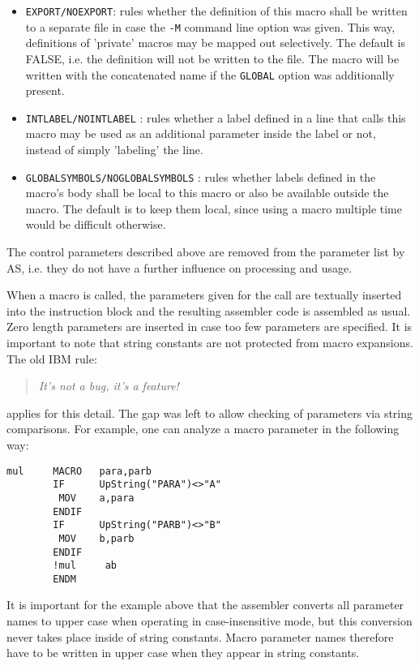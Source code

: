 \documentclass[12pt,twoside]{report}
\newcommand{\tty}[1]{{\tt #1}}
\begin{document}
\begin{itemize}
{      and be assigned to section \tty{C}.  This option is turned off by default
      and it only has an effect when it is used from within a section.
      The macro defined locally is not influenced by this option.}
\item{\tty{EXPORT/NOEXPORT}: rules whether the definition of this macro
      shall be written to a separate file in case the \tty{-M} command line
      option was given.  This way, definitions of 'private' macros may
      be mapped out selectively.  The default is FALSE, i.e. the
      definition will not be written to the file.  The macro will be
      written with the concatenated name if the \tty{GLOBAL} option was
      additionally present.}
\item{\tty{INTLABEL/NOINTLABEL} : rules whether a label defined in a line
      that calls this macro may be used as an additional parameter inside
      the label or not, instead of simply 'labeling' the line.}
\item{\tty{GLOBALSYMBOLS/NOGLOBALSYMBOLS} : rules whether labels
      defined in the macro's body shall be local to this macro or
      also be available outside the macro.  The default is to
      keep them local, since using a macro multiple time would be
      difficult otherwise.}
\end{itemize}
The control parameters described above are removed from the parameter
list by AS, i.e. they do not have a further influence on processing
and usage.

When a macro is called, the parameters given for the call are
textually inserted into the instruction block and the resulting
assembler code is assembled as usual.  Zero length parameters are
inserted in case too few parameters are specified.  It is important
to note that string constants are not protected from macro
expansions.  The old IBM rule:
\begin{quote}{\it
 It's not a bug, it's a feature!
}\end{quote}
applies for this detail.  The gap was left to allow checking of
parameters via string comparisons.  For example, one can analyze a
macro parameter in the following way:
\begin{verbatim}
mul     MACRO   para,parb
        IF      UpString("PARA")<>"A"
         MOV    a,para
        ENDIF
        IF      UpString("PARB")<>"B"
         MOV    b,parb
        ENDIF
        !mul     ab
        ENDM
\end{verbatim}
It is important for the example above that the assembler converts all
parameter names to upper case when operating in case-insensitive
mode, but this conversion never takes place inside of string constants.
Macro parameter names therefore have to be written in upper case when
they appear in string constants.
\end{document}
